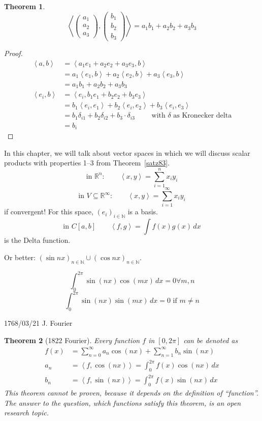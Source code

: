 \documentclass{article}
\newtheorem{theorem}{Theorem}  \numberwithin{theorem}{section}
\newcommand{\angel}[1]{\left\langle#1\right\rangle}
\begin{document}
\begin{theorem} %
  \[ \angel{\begin{pmatrix} a_1 \\ a_2 \\ a_3 \end{pmatrix}, \begin{pmatrix} b_1 \\ b_2 \\ b_3 \end{pmatrix}} = a_1 b_1 + a_2 b_2 + a_3 b_3 \]
\end{theorem}

\begin{proof}
  \begin{align*}
    \angel{a,b} &= \angel{a_1 e_1 + a_2 e_2 + a_3 e_3, b} \\
      &= a_1 \angel{e_1, b} + a_2 \angel{e_2, b} + a_3 \angel{e_3, b} \\
      &= a_1 b_1 + a_2 b_2 + a_3 b_3 \\
    \angel{e_i,b} &= \angel{e_i, b_1 e_1 + b_2 e_2 + b_3 e_3} \\
      &= b_1 \angel{e_i, e_1} + b_2 \angel{e_i, e_2} + b_3 \angel{e_i, e_3} \\
      &= b_1 \delta_{i1} + b_2 \delta_{i2} + b_3 \cdot \delta_{i3} \qquad \text{ with } \delta \text{ as Kronecker delta} \\
      &= b_i
  \end{align*}
\end{proof}

In this chapter, we will talk about vector spaces in which we will discuss scalar products with properties 1--3 from Theorem~\ref{satz83}.
\[ \text{in } \mathbb R^n: \qquad \angel{x,y} = \sum_{i=1}^n x_i y_i \]
\[ \text{in } V \subseteq \mathbb R^\infty: \qquad \angel{x,y} = \sum_{i=1}^\infty x_i y_i \]
if convergent! For this space, $(e_i)_{i \in \mathbb N}$ is a basis.
\[ \text{in } C[a,b] \qquad \angel{f,g} = \int f(x) g(x) \, dx \]
is the Delta function.

Or better: $(\sin{nx})_{n \in \mathbb N} \cup (\cos{nx})_{n \in \mathbb N}$.

\[ \int_0^{2\pi} \sin(nx) \cos(mx) \, dx = 0 \forall m,n \]
\[ \int_0^{2\pi} \sin(nx) \sin(mx) \, dx = 0 \text{ if } m \neq n \]

1768/03/21 J. Fourier

\begin{theorem}[1822 Fourier]
  Every function $f$ in $[0,2\pi]$ can be denoted as
  \begin{align*}
    f(x) &= \sum_{n=0}^\infty a_n \cos(nx) + \sum_{n=1}^\infty b_n \sin(nx) \\
    a_n &= \angel{f, \cos(nx)} = \int_0^{2\pi} f(x) \cos(nx) \, dx \\
    b_n &= \angel{f, \sin(nx)} = \int_0^{2\pi} f(x) \sin(nx) \, dx
  \end{align*}
  This theorem cannot be proven, because it depends on the definition of \enquote{function}.
  The answer to the question, which functions satisfy this theorem, is an open research topic.
\end{theorem}
\end{document}
